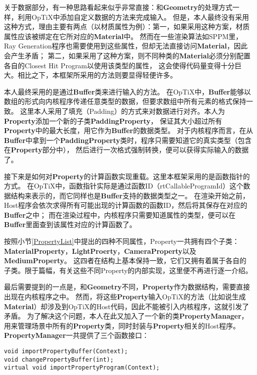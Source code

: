 关于数据部分，有一种思路看起来似乎非常直接：和\textbf{Geometry}的处理方式一样，利用OpTiX中添加自定义数据的方法来完成输入。
但是，本人最终没有采用这种方式，理由主要有两点（以材质属性为例）：第一，如果采用这种方案，材质属性应该被绑定在它所对应的\textbf{Material}中。
然而在一些渲染算法如SPPM里，Ray Generation程序也需要使用到这些属性，但却无法直接访问\textbf{Material}，因此会产生矛盾；
第二，如果采用了这种方案，则不同种类的\textbf{Material}必须分别配置各自的Closest Hit Program以使用该类型的属性，
这会使得代码量变得十分巨大。相比之下，本框架所采用的方法则要显得轻便许多。

本人最终采用的是通过\textbf{Buffer}类来进行输入的方法。
在OpTiX中，\textbf{Buffer}能够以数组的形式向内核程序传递任意类型的数据，但要求数组中所有元素的格式保持一致。
这里本人采用了填充（Padding）的方式来对数据进行对齐。本人为\textbf{Property}添加一个新的子类\textbf{PaddingProperty}，
保证其大小超过所有\textbf{Property}中的最大长度，用它作为\textbf{Buffer}的数据类型。
对于内核程序而言，在从\textbf{Buffer}中拿到一个\textbf{PaddingProperty}类时，程序只需要知道它的真实类型（包含在\textbf{Property}部分中），
然后进行一次格式强制转换，便可以获得实际输入的数据了。


接下来是如何对\textbf{Property}的计算函数实现重载。这里本框架采用的是函数指针的方式。
在OpTiX中，函数指针实际是通过函数ID（rtCallableProgramId）这个数据结构来表示的，而它同样也是\textbf{Buffer}支持的数据类型之一。
在渲染开始之前，Host程序会依次求得所有可能出现的计算函数的函数ID，然后将其保存在对应的\textbf{Buffer}之中；
而在渲染过程中，内核程序只需要知道属性的类型，便可以在\textbf{Buffer}里面查到该属性对应的计算函数了。

按照小节\ref{PropertyList}中提出的四种不同属性，Property一共拥有四个子类：\textbf{\textbf{Material}Property}，\textbf{LightProerty}，\textbf{CameraProperty}以及\textbf{MediumProperty}。
这四者在结构上基本保持一致，它们又拥有着属于各自的子类。限于篇幅，有关这些不同Property的内部实现，这里便不再进行逐一介绍。

最后需要提到的一点是，和\textbf{Geometry}不同，\textbf{Property}作为数据结构，需要直接出现在内核程序之中。
然而，将这些\textbf{Property}输入OpTiX的方法（比如说生成\textbf{Material}）却涉及到OpTiX的Host代码，因此不能被引入内核程序，这就引发了矛盾。
为了解决这个问题，本人在此又加入了一个新的类\textbf{PropertyManager}，
用来管理场景中所有的\textbf{Property}类，同时封装与\textbf{Property}相关的Host程序。\textbf{PropertyManager}一共提供了三个函数接口：

\lstset{language=C++}
\begin{lstlisting}
void importPropertyBuffer(Context);
void changePropertyBuffer(int);
virtual void importPropertyProgram(Context);
\end{lstlisting}

